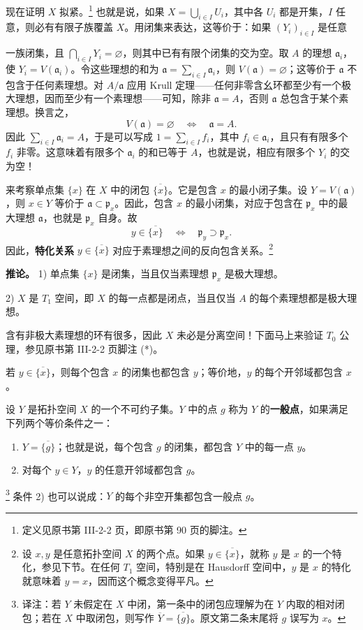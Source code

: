 现在证明 $X$ 拟紧。\footnote{定义见原书第 III-2-2 页，即原书第 90 页的脚注。}
也就是说，如果 $X=\bigcup_{i\in I}U_i$，其中各 $U_i$ 都是开集，$I$ 任意，则必有有限子族覆盖 $X$。用闭集来表达，这等价于：如果 $(Y_i)_{i\in I}$ 是任意

一族闭集，且 $\bigcap_{i\in I}Y_i=\varnothing$，则其中已有有限个闭集的交为空。取 $A$ 的理想 $\mathfrak a_i$，使 $Y_i=V(\mathfrak a_i)$。令这些理想的和为 $\mathfrak a=\sum_{i\in I}\mathfrak a_i$，则 $V(\mathfrak a)=\varnothing$；这等价于 $\mathfrak a$ 不包含于任何素理想。对 $A/\mathfrak a$ 应用 Krull 定理——任何非零含幺环都至少有一个极大理想，因而至少有一个素理想——可知，除非 $\mathfrak a=A$，否则 $\mathfrak a$ 总包含于某个素理想。换言之，
\begin{equation}\tag{2.12}
V(\mathfrak a)=\varnothing\quad\Longleftrightarrow\quad\mathfrak a=A.
\end{equation}
因此 $\sum_{i\in I}\mathfrak a_i=A$，于是可以写成 $1=\sum_{i\in I}f_i$，其中 $f_i\in\mathfrak a_i$，且只有有限多个 $f_i$ 非零。这意味着有限多个 $\mathfrak a_i$ 的和已等于 $A$，也就是说，相应有限多个 $Y_i$ 的交为空！

来考察单点集 $\{x\}$ 在 $X$ 中的闭包 $\overline{\{x\}}$。它是包含 $x$ 的最小闭子集。设 $Y=V(\mathfrak a)$，则 $x\in Y$ 等价于 $\mathfrak a\subset\mathfrak p_x$。因此，包含 $x$ 的最小闭集，对应于包含在 $\mathfrak p_x$ 中的最大理想 $\mathfrak a$，也就是 $\mathfrak p_x$ 自身。故
\begin{equation}\tag{2.13}
y\in\overline{\{x\}}\quad\Longleftrightarrow\quad\mathfrak p_y\supset\mathfrak p_x.
\end{equation}
因此，\textbf{特化关系} $y\in\overline{\{x\}}$ 对应于素理想之间的反向包含关系。\footnote{设 $x,y$ 是任意拓扑空间 $X$ 的两个点。如果 $y\in\overline{\{x\}}$，就称 $y$ 是 $x$ 的一个特化，参见下节。在任何 $T_1$ 空间，特别是在 Hausdorff 空间中，$y$ 是 $x$ 的特化就意味着 $y=x$，因而这个概念变得平凡。}

\textbf{推论。} 1) 单点集 $\{x\}$ 是闭集，当且仅当素理想 $\mathfrak p_x$ 是极大理想。

2) $X$ 是 $T_1$ 空间，即 $X$ 的每一点都是闭点，当且仅当 $A$ 的每个素理想都是极大理想。

含有非极大素理想的环有很多，因此 $X$ 未必是分离空间！下面马上来验证 $T_0$ 公理，参见原书第 III-2-2 页脚注 (*)。

若 $y\in\overline{\{x\}}$，则每个包含 $x$ 的闭集也都包含 $y$；等价地，$y$ 的每个开邻域都包含 $x$。

设 $Y$ 是拓扑空间 $X$ 的一个不可约子集。$Y$ 中的点 $g$ 称为 $Y$ 的\textbf{一般点}，如果满足下列两个等价条件之一：
\begin{enumerate}[label=\arabic*)]
\item $Y=\overline{\{g\}}$；也就是说，每个包含 $g$ 的闭集，都包含 $Y$ 中的每一点 $y$。
\item 对每个 $y\in Y$，$y$ 的任意开邻域都包含 $g$。
\end{enumerate}
\footnote{译注：若 $Y$ 未假定在 $X$ 中闭，第一条中的闭包应理解为在 $Y$ 内取的相对闭包；若在 $X$ 中取闭包，则写作 $\overline Y=\overline{\{g\}}$。原文第二条末尾将 $g$ 误写为 $x$。}
条件 2) 也可以说成：$Y$ 的每个非空开集都包含一般点 $g$。

